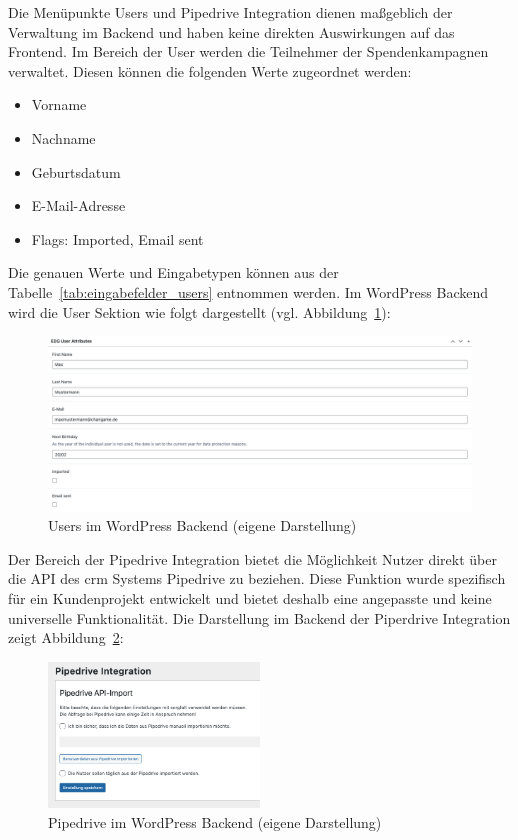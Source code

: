 Die Menüpunkte Users und Pipedrive Integration dienen maßgeblich der Verwaltung im Backend und haben keine direkten Auswirkungen auf das Frontend.
Im Bereich der User werden die Teilnehmer der Spendenkampagnen verwaltet.
Diesen können die folgenden Werte zugeordnet werden:
\begin{itemize}
    \item Vorname
    \item Nachname
    \item Geburtsdatum
    \item E-Mail-Adresse
    \item Flags: Imported, Email sent
\end{itemize}
Die genauen Werte und Eingabetypen können aus der Tabelle~\ref{tab:eingabefelder_users} entnommen werden.
Im WordPress Backend wird die User Sektion wie folgt dargestellt (vgl. Abbildung~\ref{fig:users-backend-legacy}):

\begin{figure}[H]
    \centering
    \includegraphics[width=1\textwidth]{images/legacy_users_backend}
    \caption{Users im WordPress Backend (eigene Darstellung)}
    \label{fig:users-backend-legacy}
\end{figure}

Der Bereich der Pipedrive Integration bietet die Möglichkeit Nutzer direkt über die API des \gls{crm} Systems Pipedrive zu beziehen.
Diese Funktion wurde spezifisch für ein Kundenprojekt entwickelt und bietet deshalb eine angepasste und keine universelle Funktionalität.
Die Darstellung im Backend der Piperdrive Integration zeigt Abbildung~\ref{fig:pipedrive-backend-legacy}:

\begin{figure}[H]
    \centering
    \includegraphics[width=0.5\textwidth]{images/legacy_pipedrive_backend}
    \caption{Pipedrive im WordPress Backend (eigene Darstellung)}
    \label{fig:pipedrive-backend-legacy}
\end{figure}

